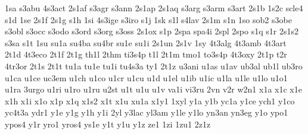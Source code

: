 {1sa
s3abu
4s3act
2s1af
s3agr
s3ann
2s1ap
2s1aq
s3arg
s3arm
s3art
2s1b
1s2c
scle4
s1d
1se
2s1f
2s1g
s1h
1si
4s3ige
s3iro
s1j
1sk
s1l
s4lav
2s1m
s1n
1so
sob2
s3obe
s3obl
s3occ
s3odo
s3ord
s3org
s3oss
2s1ox
s1p
2spa
spa4i
2spl
2spo
s1q
s1r
2s1s2
s3sa
s1t
1su
su1a
su4ba
su4br
su1e
su1i
2s1un
2s1v
1sy
4t3alg
4t3amb
4t3art
2t1d
4t3eco
2t1f
2t1g
th1l
2thm
ti3s4p
t1l
2t1m
tmo1
to3s4p
4t3oxy
2t1p
t2r
4tr3or
2t1s
2t1t
tu1a
tu1e
tu1i
tu4s3a
ty1
2t1z
u3ani
u1as
u1av
ub3al
ub1l
ub3ro
u1ca
u1ce
uc3em
u1ch
u1co
u1cr
u1cu
u1d
u1el
u1ib
u1ic
u1la
u1le
u1lo
u1o1
u1ra
3urgo
u1ri
u1ro
u1ru
u2st
u1t
u1u
u1v
va1i
vi3ru
2vn
v2r
w2n1
x1a
x1c
x1e
x1h
x1i
x1o
x1p
x1q
x1s2
x1t
x1u
xu1a
x1y1
1xyl
y1a
y1b
yc1a
y1ce
ych1
y1co
yc4t3a
ydr1
y1e
y1g
y1h
y1i
2yl
y3lac
yl3am
y1le
y1lo
yn3an
yn3eg
y1o
ypo1
ypos4
y1r
yro1
yros4
ys1e
y1t
y1u
y1z
ze1
1zi
1zu1
2z1z
}
